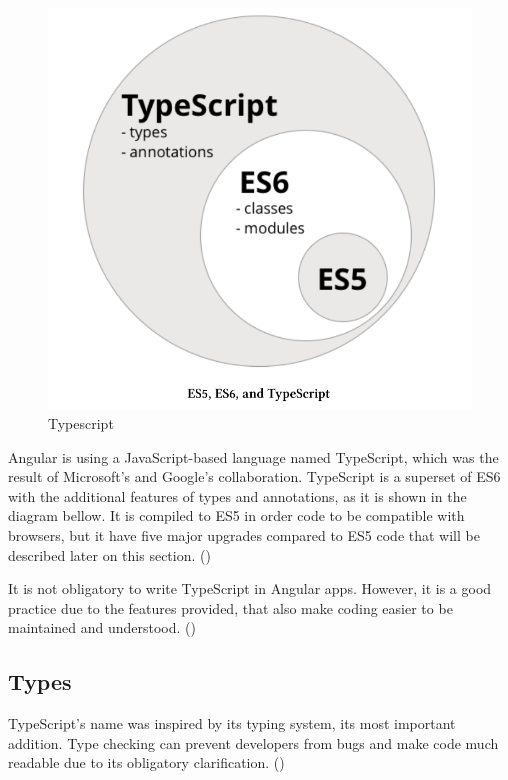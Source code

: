 \begin{figure}
	\begin{center}
		\includegraphics[scale=0.25]{images/Typescript.png}
	\end{center}
	\caption{Typescript}
\end{figure}

Angular is using a JavaScript-based language named TypeScript, which was the result of Microsoft's and Google's collaboration. TypeScript is a superset of ES6 with the additional features of types and annotations, as it is shown in the diagram bellow. It is compiled to ES5 in order code to be compatible with browsers, but it have five major upgrades compared to ES5 code that will be described later on this section. (\cite{murray2018ng}) \par

It is not obligatory to write TypeScript in Angular apps. However, it is a good practice due to the features provided, that also make coding easier to be maintained and understood. (\cite{angularUpandRunning}) \par

\subsection{Types}

TypeScript's name was inspired by its typing system, its most important addition. Type checking can prevent developers from bugs and make code much readable due to its obligatory clarification. (\cite{murray2018ng}) \par 

